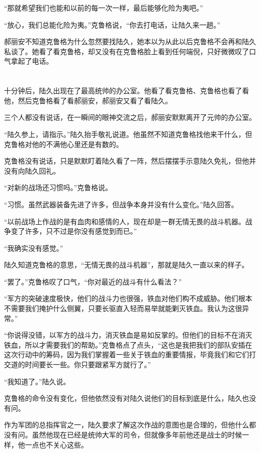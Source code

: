 “那就希望我们也能和以前的每一次一样，最后能够化险为夷吧。”

“放心，我们总能化险为夷。”克鲁格说，“你去打电话，让陆久来一趟。”

郝丽安不知道克鲁格为什么忽然要找陆久，她本以为从此以后克鲁格不会再和陆久私谈了。她看了看克鲁格，却又没有在克鲁格脸上看到任何端倪，只好微微叹了口气拿起了电话。

\section*{}

十分钟后，陆久出现在了最高统帅的办公室。他看了看克鲁格、克鲁格也看了看他，然后克鲁格看了看郝丽安，郝丽安又看了看陆久。

三个人都没有说话，在一瞬间的眼神交流之后，郝丽安默默离开了元帅的办公室。

“陆久参上，请指示。”陆久抬手敬礼说道。他虽然不知道克鲁格找他来干什么，但克鲁格对他的不满他心里还是有数的。

克鲁格没有说话，只是默默盯着陆久看了一阵，然后摆摆手示意陆久免礼，但他并没有向陆久回礼。

“对新的战场还习惯吗。”克鲁格说。

“习惯。虽然武器装备先进了许多，但战争本身并没有什么变化。”陆久回答。

“以前战场上作战的是有血肉和感情的人，现在却是一群无情无畏的战斗机器。战争变了许多，只不过是你没有感觉到而已。”

“我确实没有感觉。”

陆久知道克鲁格的意思，“无情无畏的战斗机器”，那就是陆久一直以来的样子。

“罢了。”克鲁格叹了口气，“你对最近的战斗有什么看法？”

“军方的突破速度极快，他们的战斗力也很强，铁血对他们构不成威胁。他们根本不需要我们掩护什么侧翼，只要长驱直入轻而易举就能剿灭铁血。我认为这很异常。”

“你说得没错，以军方的战斗力，消灭铁血是易如反掌的。但他们的目标不在消灭铁血，所以才需要我们的帮助。”克鲁格点了点头，“这也是我把我们的部队安插在这次行动中的筹码，因为我们掌握着一些关于铁血的重要情报，毕竟我们和它们打交道的时间要长一些。你只要跟紧军方就行了。”

“我知道了。”陆久说。

克鲁格的命令没有变化，但他依然没有对陆久说他们的目标到底是什么，陆久也没有问。

作为军团的总指挥官之一，陆久要求了解这次作战的意图也是合理的，但他什么都没有问。虽然他现在已经是统帅大军的司令，但就像多年前他还是战士的时候一样，他一点也不关心这些。

